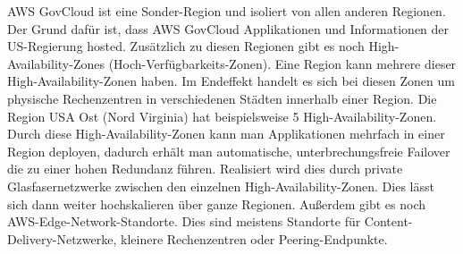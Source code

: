 \documentclass[titlepage]{report}
\begin{document}
AWS GovCloud ist eine Sonder\hyp{}Region und isoliert von allen anderen
Regionen. Der Grund dafür ist, dass AWS GovCloud Applikationen und
Informationen der US\hyp{}Regierung hosted.\cite{govcloud} Zusätzlich zu
diesen Regionen gibt es noch High\hyp{}Availability\hyp{}Zones
(Hoch\hyp{}Verfügbarkeits\hyp{}Zonen). Eine Region kann mehrere dieser
High\hyp{}Availability\hyp{}Zonen haben. Im Endeffekt handelt es sich bei
diesen Zonen um physische Rechenzentren in verschiedenen Städten innerhalb
einer Region. Die Region USA Ost (Nord Virginia) hat beispielsweise 5
High\hyp{}Availability\hyp{}Zonen. Durch diese
High\hyp{}Availability\hyp{}Zonen kann man Applikationen mehrfach in einer
Region deployen, dadurch erhält man automatische, unterbrechungsfreie Failover
die zu einer hohen Redundanz führen.\cite{region} Realisiert wird dies
durch private Glasfasernetzwerke zwischen den einzelnen
High\hyp{}Availability\hyp{}Zonen. Dies lässt sich dann weiter hochskalieren
über ganze Regionen. Außerdem gibt es noch
AWS\hyp{}Edge\hyp{}Network\hyp{}Standorte. Dies sind meistens Standorte für
Content\hyp{}Delivery\hyp{}Netzwerke, kleinere Rechenzentren oder
Peering\hyp{}Endpunkte.
\end{document}

